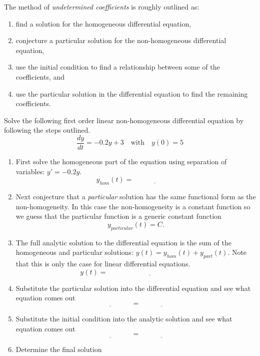 \begin{technique}
    The method of {\it undetermined coefficients} is roughly outlined as:
    \begin{enumerate}
        \item find a solution for the homogeneous differential equation,
        \item conjecture a particular solution for the non-homogeneous differential equation, 
        \item use the initial condition to find a relationship between some of the
            coefficients, and
        \item use the particular solution in the differential equation to find the
            remaining coefficients.
    \end{enumerate}
\end{technique}

\begin{problem}
    Solve the following first order linear non-homogeneous differential equation by
    following the steps outlined.
    \[ \frac{dy}{dt} = -0.2 y + 3 \quad \text{with} \quad y(0) = 5 \]
    \begin{enumerate}
        \item First solve the homogeneous part of the equation using separation of
            variables: $y' = -0.2y$.
            \[ y_{hom}(t) = \underline{\hspace{1in}} \]
        \item Next conjecture that a {\it particular} solution has the same functional
            form as the non-homogeneity.  In this case the non-homogeneity is a constant
            function so we guess that the particular function is a generic constant
            function
            \[ y_{particular}(t) = C. \]
        \item The full analytic solution to the differential equation is the sum of the
            homogeneous and particular solutions: $y(t) = y_{hom}(t) + y_{part}(t)$.  Note
            that this is only the case for linear differential equations.
            \[ y(t) = \underline{\hspace{2in}} \]
        \item Substitute the particular solution into the differential equation and see
            what equation comes out
            \[ \underline{\hspace{1in}} = \underline{\hspace{1in}} \]
        \item Substitute the initial condition into the analytic solution and see what
            equation comes out
            \[ \underline{\hspace{1in}} = \underline{\hspace{1in}} \]
        \item Determine the final solution
    \end{enumerate}
\end{problem}


